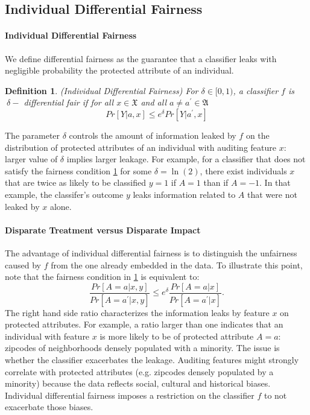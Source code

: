 \documentclass{article}
\newtheorem{defn}{Definition}[section]
\begin{document}
\subsection{Individual Differential Fairness}
\paragraph{Individual Differential Fairness} 
We define differential fairness as the guarantee that a classifier leaks with negligible probability the protected attribute of an individual.

\begin{defn}(Individual Differential Fairness)
\label{def: idf}
For $\delta \in [0, 1)$, a classifier $f$ is $\ \delta-$ differential fair if for all $x\in\mathfrak{X}$ and all $a\neq a^{'}\in \mathfrak{A}$
\begin{equation}
\label{eq: idf}
    Pr[Y|a, x] \leq e^{\delta}Pr[Y|a^{'}, x]
\end{equation}
\end{defn}

The parameter $\delta$ controls the amount of information leaked by $f$ on the distribution of protected attributes of an individual with auditing feature $x$: larger value of $\delta$ implies larger leakage. For example, for a classifier that does not satisfy the fairness condition \ref{def: idf} for some $\delta=\ln(2)$, there exist individuals $x$ that are twice as likely to be classified $y=1$ if $A=1$ than if $A=-1$. In that example, the classifer's outcome $y$ leaks information related to $A$ that were not leaked by $x$ alone.   

\paragraph{Disparate Treatment versus Disparate Impact}
The advantage of individual differential fairness is to distinguish the unfairness caused by $f$  from the one already embedded in the data. To illustrate this point, note that the fairness condition in \ref{def: idf} is equivalent to:
\begin{equation}
    \frac{Pr[A=a|x, y]}{Pr[A=a^{'}|x, y]} \leq e^{\delta}\frac{Pr[A=a|x]}{Pr[A=a^{'}|x]}.
\end{equation}
The right hand side ratio characterizes the information leaks by feature $x$ on protected attributes. For example, a ratio larger than one indicates that an individual with feature $x$ is more likely to be of protected attribute $A=a$: zipcodes of neighborhoods densely populated with a minority.  The issue is whether the classifier exacerbates the leakage. Auditing features might strongly correlate with protected attributes (e.g. zipcodes densely populated by a minority) because the data reflects social, cultural and historical biases. Individual differential fairness imposes a restriction on the classifier $f$ to not exacerbate those biases. 
\end{document}
